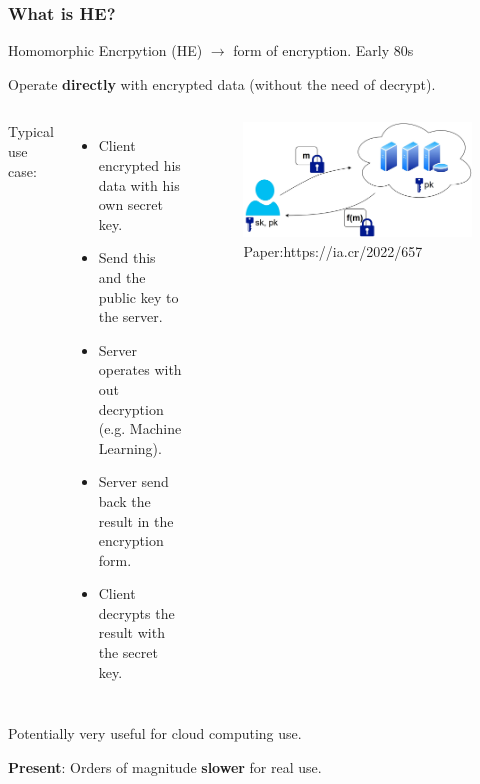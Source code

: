 \documentclass[10pt,handout]{beamer}
\begin{document}
\begin{frame}
\frametitle{What is HE?}


    Homomorphic Encrpytion (HE) $\rightarrow$ form of encryption. Early 80s
\vspace{-0.3cm}

    Operate \textbf{directly} with encrypted data (without the need of decrypt).
\vspace{0.3cm}
  \begin{columns}
Typical use case:
\begin{itemize}
    \item Client encrypted his data with his own secret key.
    \item Send this and the public key to the server.
    \item Server operates with out decryption (e.g. Machine Learning).
    \item Server send back the result in the encryption form.
    \item Client decrypts the result with the secret key.
\end{itemize}



\begin{figure}[h!]
    \centering
    \includegraphics[scale=0.1]{fhe.jpg}
    \caption{Paper:https://ia.cr/2022/657}
\end{figure}
\end{columns}
 \vspace{-0.3cm}


Potentially very useful for cloud computing use.
 \vspace{-0.3cm}

 \pause
    \textbf{Present}: Orders of magnitude \textbf{slower} for real use.


\end{frame}
\end{document}

